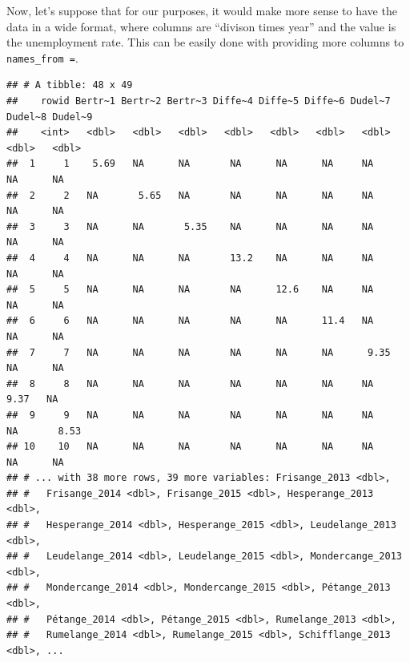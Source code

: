 \documentclass[
]{article}
\newenvironment{Shaded}{\begin{snugshade}}{\end{snugshade}}
\newcommand{\AttributeTok}[1]{\textcolor[rgb]{0.77,0.63,0.00}{#1}}
\newcommand{\DecValTok}[1]{\textcolor[rgb]{0.00,0.00,0.81}{#1}}
\newcommand{\FunctionTok}[1]{\textcolor[rgb]{0.00,0.00,0.00}{#1}}
\newcommand{\NormalTok}[1]{#1}
\newcommand{\OtherTok}[1]{\textcolor[rgb]{0.56,0.35,0.01}{#1}}
\newcommand{\SpecialCharTok}[1]{\textcolor[rgb]{0.00,0.00,0.00}{#1}}
\newcommand{\StringTok}[1]{\textcolor[rgb]{0.31,0.60,0.02}{#1}}
\begin{document}
Now, let's suppose that for our purposes, it would make more sense to have the data in a wide format,
where columns are ``divison times year'' and the value is the unemployment rate. This can be easily done
with providing more columns to \texttt{names\_from\ =}.

\begin{Shaded}
\end{Shaded}

\begin{verbatim}
## # A tibble: 48 x 49
##    rowid Bertr~1 Bertr~2 Bertr~3 Diffe~4 Diffe~5 Diffe~6 Dudel~7 Dudel~8 Dudel~9
##    <int>   <dbl>   <dbl>   <dbl>   <dbl>   <dbl>   <dbl>   <dbl>   <dbl>   <dbl>
##  1     1    5.69   NA      NA       NA      NA      NA     NA      NA      NA   
##  2     2   NA       5.65   NA       NA      NA      NA     NA      NA      NA   
##  3     3   NA      NA       5.35    NA      NA      NA     NA      NA      NA   
##  4     4   NA      NA      NA       13.2    NA      NA     NA      NA      NA   
##  5     5   NA      NA      NA       NA      12.6    NA     NA      NA      NA   
##  6     6   NA      NA      NA       NA      NA      11.4   NA      NA      NA   
##  7     7   NA      NA      NA       NA      NA      NA      9.35   NA      NA   
##  8     8   NA      NA      NA       NA      NA      NA     NA       9.37   NA   
##  9     9   NA      NA      NA       NA      NA      NA     NA      NA       8.53
## 10    10   NA      NA      NA       NA      NA      NA     NA      NA      NA   
## # ... with 38 more rows, 39 more variables: Frisange_2013 <dbl>,
## #   Frisange_2014 <dbl>, Frisange_2015 <dbl>, Hesperange_2013 <dbl>,
## #   Hesperange_2014 <dbl>, Hesperange_2015 <dbl>, Leudelange_2013 <dbl>,
## #   Leudelange_2014 <dbl>, Leudelange_2015 <dbl>, Mondercange_2013 <dbl>,
## #   Mondercange_2014 <dbl>, Mondercange_2015 <dbl>, Pétange_2013 <dbl>,
## #   Pétange_2014 <dbl>, Pétange_2015 <dbl>, Rumelange_2013 <dbl>,
## #   Rumelange_2014 <dbl>, Rumelange_2015 <dbl>, Schifflange_2013 <dbl>, ...
\end{verbatim}
\end{document}
